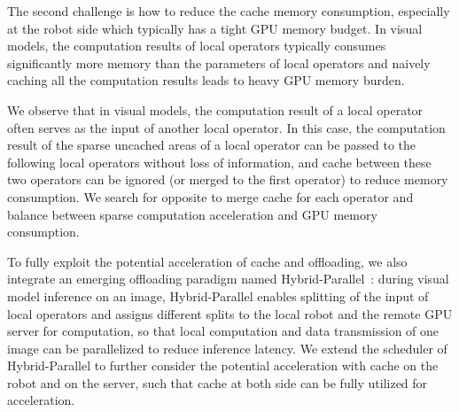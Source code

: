 The second challenge is how to reduce the cache memory consumption, especially at the robot side which typically has a tight GPU memory budget.
In visual models, the computation results of local operators typically consumes significantly more memory than the parameters of local operators and naively caching all the computation results leads to heavy GPU memory burden.

We observe that in visual models, the computation result of a local operator often serves as the input of another local operator. 
In this case, the computation result of the sparse uncached areas of a local operator can be passed to the following local operators without loss of information, and cache between these two operators can be ignored (or merged to the first operator) to reduce memory consumption.
We search for opposite to merge cache for each operator and balance between sparse computation acceleration and GPU memory consumption.

To fully exploit the potential acceleration of cache and offloading, we also integrate an emerging offloading paradigm named Hybrid-Parallel~\cite{sun2024hybridparallel}: during visual model inference on an image, Hybrid-Parallel enables splitting of the input of local operators and assigns different splits to the local robot and the remote GPU server for computation, so that local computation and data transmission of one image can be parallelized to reduce inference latency.
We extend the scheduler of Hybrid-Parallel to further consider the potential acceleration with cache on the robot and on the server, such that cache at both side can be fully utilized for acceleration.


